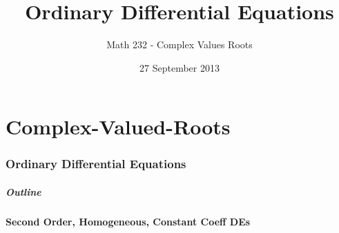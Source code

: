 \part{Complex-Valued-Roots}
\section{Ordinary Differential Equations}

\title{Ordinary Differential Equations}
\subtitle{Math 232 - Complex Values Roots}
\date{27 September 2013}

\begin{frame}
  \titlepage
\end{frame}

\begin{frame}
  \frametitle{Outline}
  \tableofcontents[currentsection]
\end{frame}


\subsection{Second Order, Homogeneous, Constant Coeff DEs}

